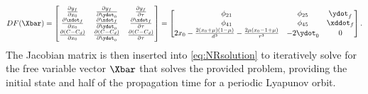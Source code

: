 \begin{equation}
    DF(\Xbar)=\begin{bmatrix}   \frac{\partial y_{f}}{\partial x_{0}}                                       &   \frac{\partial y_{f}}{\partial\ydot_{0}}    &   \frac{\partial y_{f}}{\partial\tau}     \\
                                \frac{\partial\xdot_{f}}{\partial x_{0}}                                    &   \frac{\partial\xdot_{f}}{\partial\ydot_{0}} &   \frac{\partial\xdot_{f}}{\partial\tau}  \\
                                \frac{\partial(C-C_{d})}{\partial x_{0}}                                    &   \frac{\partial(C-C_{d})}{\partial\ydot_{0}} &   \frac{\partial(C-C_{d})}{\partial\tau}  \end{bmatrix}
             =\begin{bmatrix}   \phi_{21}                                                                   &   \phi_{25}                                   &   \ydot_{f}                               \\
                                \phi_{41}                                                                   &   \phi_{45}                                   &   \xddot_{f}                              \\
                                2x_{0}-\frac{2(x_{0}+\mu)(1-\mu)}{d^{3}}-\frac{2\mu(x_{0}-1+\mu)}{r^{3}}    &   -2\ydot_{0}                                 &   0                                       \end{bmatrix}.
    \label{eq:Lyapunovjacobian}
\end{equation}
The Jacobian matrix is then inserted into \cref{eq:NRsolution} to iteratively solve for the free
variable vector $\Xbar$ that solves the provided problem, providing the initial state and half of
the propagation time for a periodic Lyapunov orbit.


